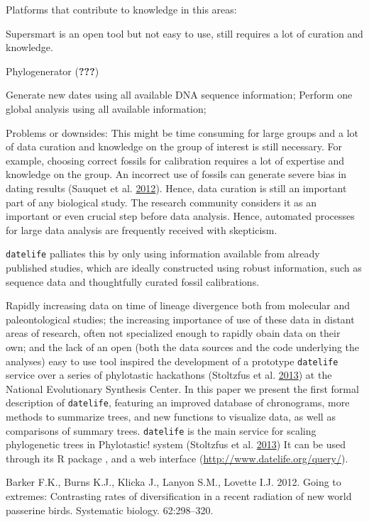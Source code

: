 \documentclass[]{article}
\begin{document}
Platforms that contribute to knowledge in this areas:

Supersmart is an open tool but not easy to use, still requires a lot of curation and knowledge.

Phylogenerator ({\textbf{???}})

Generate new dates using all available DNA sequence information;
Perform one global analysis using all available information;

Problems or downsides: This might be time consuming for large groups and a lot of
data curation and knowledge on the group of interest is still necessary. For example,
choosing correct fossils for calibration
requires a lot of expertise and knowledge on the group. An incorrect use of fossils
can generate severe bias in dating results (Sauquet et al. \protect\hyperlink{ref-Sauquet2012c}{2012}).
Hence, data curation is still an important part of any biological study. The research
community considers it as an important or even crucial step before data analysis.
Hence, automated processes for large data analysis are frequently received with skepticism.

\texttt{datelife} palliates this by only using information available from already published
studies, which are ideally constructed using robust information, such as sequence
data and thoughtfully curated fossil calibrations.

Rapidly increasing data on time of lineage divergence both from molecular and paleontological studies; the increasing importance of use of these data in distant areas of research, often not specialized enough to rapidly obain data on their own; and the lack of an open (both the data sources and the code underlying the analyses) easy to use tool
inspired the development of a prototype \texttt{datelife} service over a series
of phylotastic hackathons (Stoltzfus et al. \protect\hyperlink{ref-Stoltzfus2013}{2013}) at the National Evolutionary Synthesis Center.
In this paper we present the first formal description of \texttt{datelife}, featuring an improved database of chronograms, more methods to summarize trees, and new functions to visualize data, as well as comparisons of summary trees.
\texttt{datelife} is the main service for scaling phylogenetic trees in Phylotastic! system
(Stoltzfus et al. \protect\hyperlink{ref-Stoltzfus2013}{2013})
It can be used through its R package , and a web interface
(\url{http://www.datelife.org/query/}).

\hypertarget{refs}{}
\leavevmode\hypertarget{ref-barker2012going}{}%
Barker F.K., Burns K.J., Klicka J., Lanyon S.M., Lovette I.J. 2012. Going to extremes: Contrasting rates of diversification in a recent radiation of new world passerine birds. Systematic biology. 62:298--320.
\end{document}
